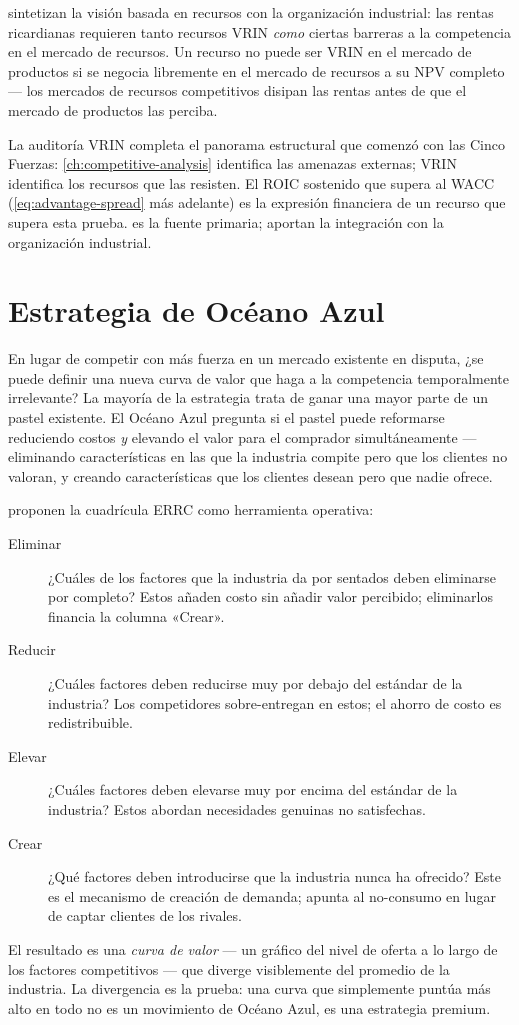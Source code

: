 \textcite{dranove7theconomics} sintetizan la visión basada en recursos con la organización
industrial: las rentas ricardianas requieren tanto recursos VRIN \emph{como} ciertas barreras
a la competencia en el mercado de recursos. Un recurso no puede ser VRIN en el mercado de
productos si se negocia libremente en el mercado de recursos a su NPV completo --- los
mercados de recursos competitivos disipan las rentas antes de que el mercado de productos las
perciba.

La auditoría VRIN completa el panorama estructural que comenzó con las Cinco Fuerzas:
\cref{ch:competitive-analysis} identifica las amenazas externas; VRIN identifica los recursos
que las resisten. El ROIC sostenido que supera al WACC (\cref{eq:advantage-spread} más
adelante) es la expresión financiera de un recurso que supera esta prueba. \textcite{barney1991resource}
es la fuente primaria; \textcite{dranove7theconomics} aportan la integración con la organización
industrial.

\section{Estrategia de Océano Azul}\label{sec:blue-ocean}

En lugar de competir con más fuerza en un mercado existente en disputa, ¿se puede definir una
nueva curva de valor que haga a la competencia temporalmente irrelevante? La mayoría de la
estrategia trata de ganar una mayor parte de un pastel existente. El Océano Azul pregunta si
el pastel puede reformarse reduciendo costos \emph{y} elevando el valor para el comprador
simultáneamente --- eliminando características en las que la industria compite pero que los
clientes no valoran, y creando características que los clientes desean pero que nadie ofrece.

\textcite{kim2015} proponen la cuadrícula ERRC como herramienta operativa:
\begin{description}
  \item[Eliminar] ¿Cuáles de los factores que la industria da por sentados deben eliminarse por
        completo? Estos añaden costo sin añadir valor percibido; eliminarlos financia la columna
        «Crear».
  \item[Reducir] ¿Cuáles factores deben reducirse muy por debajo del estándar de la industria?
        Los competidores sobre-entregan en estos; el ahorro de costo es redistribuible.
  \item[Elevar] ¿Cuáles factores deben elevarse muy por encima del estándar de la industria?
        Estos abordan necesidades genuinas no satisfechas.
  \item[Crear] ¿Qué factores deben introducirse que la industria nunca ha ofrecido? Este es el
        mecanismo de creación de demanda; apunta al no-consumo en lugar de captar clientes de
        los rivales.
\end{description}
El resultado es una \emph{curva de valor} --- un gráfico del nivel de oferta a lo largo de los
factores competitivos --- que diverge visiblemente del promedio de la industria. La divergencia
es la prueba: una curva que simplemente puntúa más alto en todo no es un movimiento de Océano
Azul, es una estrategia premium.

